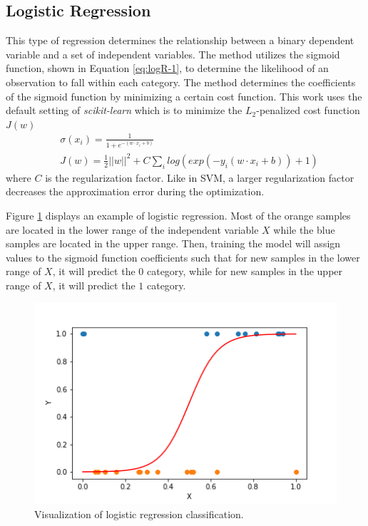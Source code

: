 \subsection{Logistic Regression}


This type of regression determines the relationship between a binary dependent variable and a set of independent variables.
The method utilizes the sigmoid function, shown in Equation \ref{eq:logR-1}, to determine the likelihood of an observation to fall within each category.
The method determines the coefficients of the sigmoid function by minimizing a certain cost function.
This work uses the default setting of \textit{scikit-learn} which is to minimize the $L_2$-penalized cost function $J(w)$
\begin{align}
& \sigma(x_i) = \frac{1}{1+e^{-(w \cdot x_i + b)}} \label{eq:logR-1} \\
& J(w) = \frac{1}{2} ||w||^2 + C \sum_i log(exp(-y_i(w \cdot x_i + b))+1) \label{eq:logR-2}
\end{align}
where $C$ is the regularization factor.
Like in SVM, a larger regularization factor decreases the approximation error during the optimization.

Figure \ref{fig:logR} displays an example of logistic regression.
Most of the orange samples are located in the lower range of the independent variable $X$ while the blue samples are located in the upper range.
Then, training the model will assign values to the sigmoid function coefficients such that for new samples in the lower range of $X$, it will predict the $0$ category, while for new samples in the upper range of $X$, it will predict the $1$ category.

\begin{figure}[htbp!] %
  \centering
  \includegraphics[width=0.5\linewidth]{figures/LogR}
  \caption{Visualization of logistic regression classification.}
  \label{fig:logR}
\end{figure}


